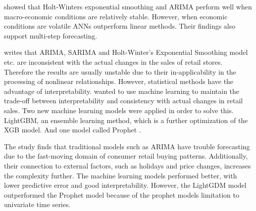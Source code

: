 \cite{Chu2003} showed that Holt-Winters exponential smoothing and ARIMA perform well when macro-economic
conditions are relatively stable. However, when economic conditions are volatile
ANNs outperform linear methods.
Their findings also support multi-step forecasting.




\cite{Weng2020} writes that ARIMA, SARIMA and Holt-Winter's
Exponential Smoothing model etc. are inconsistent with the actual changes in the sales
of retail stores.
Therefore the results are usually unstable due to their in-applicability
in the processing of nonlinear relationships.
However, statistical methods have the advantage of interpretability.
\cite{Bowen2020} wanted to use machine learning to maintain
the trade-off between interpretability and consistency with actual
changes in retail sales.
Two new machine learning models were applied in order to solve this.
LightGBM, an ensemble learning method, which is a further optimization of the XGB model.
And one model called Prophet \citep{Zunic2020}.

The study finds that traditional models such as ARIMA have trouble forecasting
due to the fast-moving domain of consumer retail buying patterns.
Additionally, their connection to external factors,
such as holidays and price changes, increases the complexity further.
The machine learning models performed better, with lower predictive error
and good interpretability.
However, the LightGDM model outperformed the Prophet model because of the prophet
models limitation to univariate time series.


